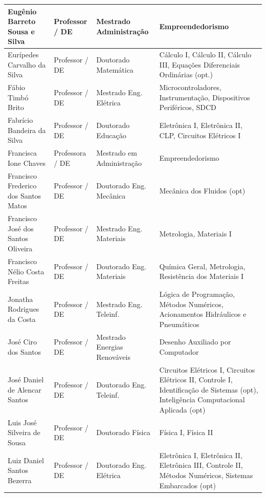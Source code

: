 \documentclass{paper}
\begin{document}
\begin{longtable}{|p{3.0cm}|p{2.5cm}|p{2.0cm}|p{6.3cm}|}
    Eugênio Barreto Sousa e Silva & Professor / DE  &  Mestrado Administração &  Empreendedorismo \\ \hline
    Eurípedes Carvalho da Silva & Professor / DE  &  Doutorado Matemática &  Cálculo I, Cálculo II, Cálculo III, Equações Diferenciais Ordinárias (opt.) \\ \hline
    Fábio Timbó Brito & Professor / DE  &  Mestrado Eng. Elétrica  & Microcontroladores, Instrumentação, Dispositivos Periféricos, SDCD \\ \hline
    Fabrício Bandeira da Silva  &  Professor / DE & Doutorado Educação  &  Eletrônica I, Eletrônica II, CLP, Circuitos Elétricos I \\ \hline
    Francisca Ione Chaves   &  Professora / DE & Mestrado em Administração   &  Empreendedorismo \\ \hline
    Francisco Frederico dos Santos Matos   &  Professor / DE  &  Doutorado Eng. Mecânica  &  Mecânica dos Fluidos (opt) \\ \hline
    Francisco José dos Santos Oliveira   &  Professor / DE  &  Mestrado Eng. Materiais  &  Metrologia, Materiais I  \\ \hline
    Francisco Nélio Costa Freitas  &  Professor / DE  & Doutorado Eng. Materiais  &  Química Geral, Metrologia, Resistência dos Materiais I \\ \hline
    Jonatha Rodrigues da Costa  &  Professor / DE  & Mestrado Eng. Teleinf.  &  Lógica de Programação, Métodos Numéricos, Acionamentos Hidráulicos e Pneumáticos  \\ \hline
    José Ciro dos Santos & Professor / DE  &  Mestrado Energias Renováveis &  Desenho Auxiliado por Computador \\ \hline
    José Daniel de Alencar Santos & Professor / DE  &  Doutorado Eng. Teleinf. &  Circuitos Elétricos I, Circuitos Elétricos II, Controle I, Identificação de Sistemas (opt), Inteligência Computacional Aplicada (opt) \\ \hline
    Luis José Silveira de Sousa & Professor / DE  &  Doutorado Física  &  Física I, Física II \\ \hline
    Luiz Daniel Santos Bezerra & Professor / DE  &  Doutorado Eng. Elétrica  &  Eletrônica I, Eletrônica II, Eletrônica III, Controle II, Métodos Numéricos, Sistemas Embarcados (opt)  \\ \hline

\end{longtable}
\end{document}
